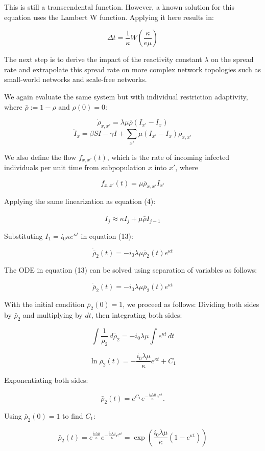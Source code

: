This is still a transcendental function. However, a known solution for this equation uses the Lambert W function. Applying it here results in:

$$
\Delta t = \frac{1}{\kappa} W\left(\frac{\kappa}{e \mu}\right)
$$

The next step is to derive the impact of the reactivity constant $\lambda$ on the spread rate and extrapolate this spread rate on more complex network topologies such as small-world networks and scale-free networks.

We again evaluate the same system but with individual restriction adaptivity, where $\bar \rho := 1 - \rho$ and $\rho(0) = 0$:

$$
\dot \rho_{x,x'} = \lambda \mu \bar \rho (I_{x'} - I_x)
$$
$$
\dot I_x = \beta S I - \gamma I +  \sum_{x'} \mu (I_{x'} - I_x) \bar \rho_{x,x'}
$$

We also define the flow $f_{x,x'}(t)$, which is the rate of incoming infected individuals per unit time from subpopulation $x$ into $x'$, where 

$$
f_{x,x'}(t) = \mu \bar \rho_{x,x'} I_{x'}
$$

Applying the same linearization as equation (4):

$$
\dot I_j \approx \kappa I_j + \mu \bar \rho I_{j-1} 
$$

Substituting $I_1 = i_0 \kappa e^{\kappa t}$ in equation (13):

$$
\dot{\bar{\rho}}_2(t) = - i_{0} \lambda \mu \bar \rho_{2}(t) e^{\kappa t}
$$

The ODE in equation (13) can be solved using separation of variables as follows:

$$
\dot{\bar{\rho}}_2(t) = - i_{0} \lambda \mu \bar \rho_{2}(t) e^{\kappa t}
$$

With the initial condition $\bar \rho_{2}(0) = 1$, we proceed as follows:
Dividing both sides by $\bar \rho_{2}$ and multiplying by $dt$, then integrating both sides:

$$
\int \frac{1}{\bar \rho_{2}} \, d\bar \rho_{2} = - i_{0} \lambda \mu \int e^{\kappa t} \, dt
$$

$$
\ln \bar \rho_{2}(t) = - \frac{i_{0} \lambda \mu}{\kappa} e^{\kappa t} + C_1
$$

Exponentiating both sides:

$$
\bar \rho_{2}(t) = e^{C_1} e^{-\frac{i_{0} \lambda \mu}{\kappa} e^{\kappa t}}.
$$ 

Using $\bar \rho_{2}(0) = 1$ to find $C_1$:

$$
\bar \rho_{2}(t) = e^{\frac{i_{0} \lambda \mu}{\kappa}} e^{-\frac{i_{0} \lambda \mu}{\kappa} e^{\kappa t}}
 = \exp\left(\frac{i_{0} \lambda \mu}{\kappa} \left( 1 - e^{\kappa t} \right)\right) 
$$

